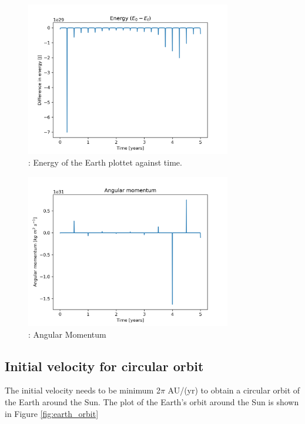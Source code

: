 \documentclass{article}
\begin{document}
\begin{figure}[H]
    \begin{center}
        \includegraphics[width=0.8\textwidth]{./Plot/energy.png}
        \caption{: Energy of the Earth plottet against time.
        }
        \label{fig:energy}
    \end{center}
\end{figure}

\begin{figure}[H]
    \begin{center}
        \includegraphics[width=0.8\textwidth]{./Plot/angular_momentum.png}
        \caption{: Angular Momentum}
        \label{fig:am}
    \end{center}
\end{figure}

\subsection{Initial velocity for circular orbit}
The initial velocity needs to be minimum 2$\pi$ AU/(yr) to obtain a circular orbit of the Earth around the Sun.
The plot of the Earth's orbit around the Sun is shown in Figure \ref{fig:earth_orbit}
\end{document}
